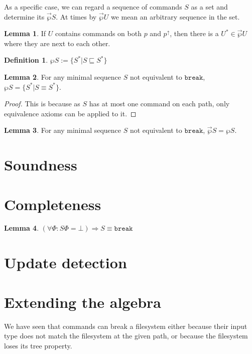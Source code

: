 \documentclass[12pt]{article}
\newcommand{\empt}{\bot}
\newcommand{\FS}{\Phi} %
\newcommand{\pp}{p^\uparrow} %
\newcommand{\cbrk}{\mathtt{break}}
\newcommand{\eqext}{\sqsubseteq}
\newcommand{\extset}[1]{\wp{#1}}
\newcommand{\orderset}[1]{\vec{\wp}{#1}}
\theoremstyle{definition}
\newtheorem{mydef}{Definition}
\newtheorem{mylem}{Lemma}
\begin{document}
As a specific case, we can regard a sequence of commands $S$
as a set and determine its $\orderset{S}$.
At times by $\orderset{U}$ we mean an arbitrary sequence in the set.

\begin{mylem}\label{lemma:neighbour}
If $U$ contains commands on both $p$ and $\pp$, then
there is a $U^*\in\orderset{U}$ where they are next to each other.
\end{mylem}

\begin{mydef}
$\extset{S} := \{S^*|S\eqext S^*\}$
\end{mydef}

\begin{mylem}\label{lemma:minextset}
For any minimal sequence $S$ not equivalent to $\cbrk$, $\extset{S} = \{S^*|S\equiv S^*\}$.
\end{mylem}
\begin{proof}
This is because as $S$ has at most one command on each path, only equivalence axioms
can be applied to it.
\end{proof}

\begin{mylem}\label{lemma:minextorder}
For any minimal sequence $S$ not equivalent to $\cbrk$,
$\orderset{S} = \extset{S}$.
\end{mylem}

\section{Soundness}

\section{Completeness}

\begin{mylem}
\((\forall\FS: S\FS = \empt) \Rightarrow S \equiv \cbrk\)
\end{mylem}

\section{Update detection}

\section{Extending the algebra}

We have seen that commands can break a filesystem
either because their input type does not match the filesystem at the given path,
or because the filesystem loses its tree property.
\end{document}
